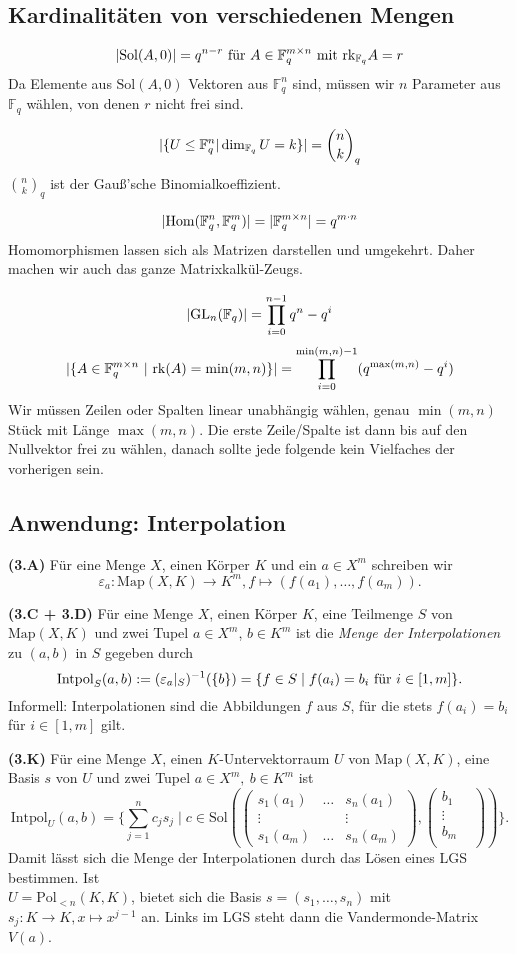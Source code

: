\documentclass[a4paper,parskip=half*,DIV=15,fontsize=11pt]{scrartcl}
\newlength{\hangwidth}
\newcommand{\skript}[1]{\settowidth{\hangwidth}{\textbf{(#1)} }\hangpara{\hangwidth}{1}\textbf{(#1)} \ignorespaces} %
\newcommand{\Sol}{\mathrm{Sol}} %
\newcommand{\rk}{\mathrm{rk}} %
\newcommand{\GL}{\mathrm{GL}} %
\newcommand{\Map}{\mathrm{Map}} %
\newcommand{\Pol}{\mathrm{Pol}} %
\newcommand{\Field}{\mathbb{F}} %
\newcommand{\Intpol}{\mathrm{Intpol}}
\DeclarePairedDelimiter\abs{\lvert}{\rvert} %
\DeclarePairedDelimiter\set{\{}{\}} %
\begin{document}
\subsection{Kardinalitäten von verschiedenen Mengen}

$$\abs{\Sol(A,0)} = q^{n-r} \text{ für } A \in \Field_q^{m \times n} \text{ mit } \rk_{\Field_q} A = r$$
Da Elemente aus $\Sol(A,0)$ Vektoren aus $\Field_q^n$ sind, müssen wir $n$ Parameter aus $\Field_q$ wählen, von denen $r$ nicht frei sind.

$$\abs{\{ U \leq \Field_q^n | \dim_{\Field_q} U = k \}} = \binom{n}{k}_q$$
$\binom{n}{k}_q$ ist der Gauß'sche Binomialkoeffizient.

$$\abs{\mathrm{Hom}(\Field_q^n,\Field_q^m)} = \abs{\Field_q^{m \times n}} = q^{m \cdot n}$$
Homomorphismen lassen sich als Matrizen darstellen und umgekehrt. Daher machen wir auch das ganze Matrixkalkül-Zeugs.

$$\abs{\GL_n(\Field_q)} = \prod_{i=0}^{n-1} q^n-q^i$$
$$\abs{\{A \in \Field_q^{m \times n} ~ | ~ \rk(A) = \min(m,n)\}} = \prod_{i=0}^{\min(m,n)-1} (q^{\max(m,n)}-q^i)$$
Wir müssen Zeilen oder Spalten linear unabhängig wählen, genau $\min(m,n)$ Stück mit Länge $\max(m,n)$. Die erste Zeile/Spalte ist dann bis auf den Nullvektor frei zu wählen, danach sollte jede folgende kein Vielfaches der vorherigen sein.

\subsection{Anwendung: Interpolation}
\skript{3.A} Für eine Menge $X$, einen Körper $K$ und ein $a \in X^m$ schreiben wir
$$\varepsilon_a:\Map(X,K) \to K^m, f \mapsto (f(a_1),\dots,f(a_m)).$$

\skript{3.C + 3.D} Für eine Menge $X$, einen Körper $K$, eine Teilmenge $S$ von $\Map(X,K)$ und zwei Tupel $a \in X^m$, $b\in K^m$ ist die \textit{Menge der Interpolationen} zu $(a,b)$ in $S$ gegeben durch
$$\Intpol_S(a,b):=(\varepsilon_a|_S)^{-1}(\{b\}) = \set{f \in S \;|\; f(a_i) = b_i \text{ für } i \in [1,m]}.$$
Informell: Interpolationen sind die Abbildungen $f$ aus $S$, für die stets $f(a_i)=b_i$ für $i \in [1,m]$ gilt.

\skript{3.K} Für eine Menge $X$, einen $K$-Untervektorraum $U$ von $\Map(X,K)$, eine Basis $s$ von $U$ und zwei Tupel $a \in X^m,\ b \in K^m$ ist
$$\Intpol_U(a,b)=\{\sum_{j=1}^{n}c_j s_j \;|\; c \in \Sol(
	\left(\begin{array}{ccc}
	s_1(a_1)& \dots & s_n(a_1)	\\
	\vdots & &  \vdots	\\
	s_1(a_m) & \dots & s_n(a_m)
	\end{array}\right),
	\left(\begin{array}{cc}
	b_1 &\\
	\vdots &\\
	b_m &\\
	\end{array}\right)
	)\}.$$
Damit lässt sich die Menge der Interpolationen durch das Lösen eines LGS bestimmen. Ist\\ $U = \Pol_{<n}(K,K)$, bietet sich die Basis $s=(s_1,\dots,s_n)$ mit $s_j : K \rightarrow K, x \mapsto x^{j-1}$ an. Links im LGS steht dann die Vandermonde-Matrix $V(a)$.
\end{document}
